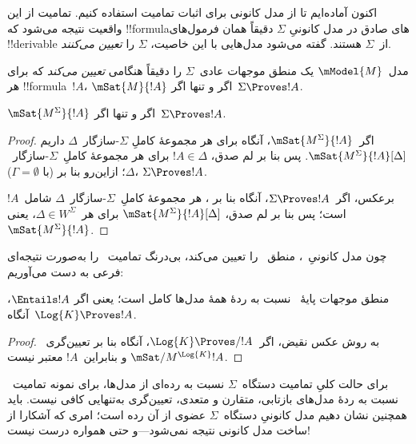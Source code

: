 \documentclass[../../../include/open-logic-section]{subfiles}
\begin{document}


اکنون آماده‌ایم تا از مدل کانونی برای اثبات تمامیت استفاده کنیم. تمامیت
از این واقعیت نتیجه می‌شود که !!{formula}های صادق در مدل کانونیِ
$\Sigma$ دقیقاً همان فرمول‌های !!{derivable} از~$\Sigma$ هستند. گفته
می‌شود مدل‌هایی با این خاصیت، $\Sigma$ را \emph{تعیین می‌کنند}.

\begin{defn}
  مدل~$\mModel{M}$ یک منطق موجهات عادی~$\Sigma$ را دقیقاً هنگامی
  \emph{تعیین می‌کند} که برای هر !!{formula}~$!A$،
  $\mSat{M}{!A}$ اگر و تنها اگر~$\Sigma \Proves !A$.
\end{defn}

\begin{thm}
   $\mSat{M^\Sigma}{!A}$ اگر و تنها اگر~$\Sigma \Proves !A$.
\end{thm}

\begin{proof}
  اگر~$\mSat{M^\Sigma}{!A}$، آنگاه برای هر مجموعهٔ کاملِ
  $\Sigma$-سازگار~$\Delta$ داریم
  $\mSat{M^\Sigma}{!A}[\Delta]$. پس بنا بر لم صدق، $!A \in
  \Delta$ برای هر مجموعهٔ کاملِ~$\Sigma$-سازگار~$\Delta$؛ ازاین‌رو
  بنا بر  (با
  $\Gamma = \emptyset$)، $\Sigma \Proves !A$.

  برعکس، اگر~$\Sigma \Proves !A$، آنگاه بنا بر
  ، هر
  مجموعهٔ کاملِ~$\Sigma$-سازگار~$\Delta$ شامل~$!A$ است؛ پس بنا بر لم
  صدق، $\mSat{M^\Sigma}{!A}[\Delta]$ برای هر~$\Delta \in
  W^\Sigma$، یعنی~$\mSat{M^\Sigma}{!A}$.
\end{proof}

چون مدل کانونیِ~، منطق~ را تعیین می‌کند، بی‌درنگ
تمامیت~ را به‌صورت نتیجه‌ای فرعی به دست می‌آوریم:

\begin{cor}
  منطق موجهات پایهٔ~ نسبت به ردهٔ همهٔ مدل‌ها کامل است؛ یعنی اگر
  $\Entails !A$، آنگاه~$\Log{K} \Proves !A$.
\end{cor}

\begin{proof}
  به روش عکس نقیض، اگر~$\Log{K} \Proves/ !A$، آنگاه بنا بر
  تعیین‌گری~$\mSat/{M^{\Log{K}}}{!A}$ و بنابراین~$!A$ معتبر نیست.
\end{proof}

برای حالت کلیِ تمامیت دستگاه~$\Sigma$ نسبت به رده‌ای از مدل‌ها، برای
نمونه تمامیت~ نسبت به ردهٔ مدل‌های بازتابی، متقارن و متعدی،
تعیین‌گری به‌تنهایی کافی نیست. باید همچنین نشان دهیم مدل کانونیِ
دستگاه~$\Sigma$ عضوی از آن رده است؛ امری که آشکارا از ساخت مدل کانونی
نتیجه نمی‌شود---و حتی همواره درست نیست!
\end{document}

